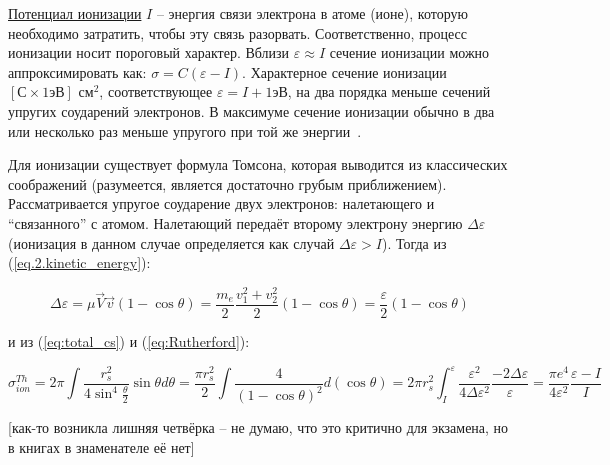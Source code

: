 \documentclass[10pt, a4paper]{article}
\numberwithin{equation}{section}
\begin{document}
\uline{Потенциал ионизации} $I$ -- энергия связи электрона в атоме (ионе), которую необходимо затратить, чтобы эту связь разорвать. Соответственно, процесс ионизации носит пороговый характер. Вблизи $\varepsilon \approx I$ сечение ионизации можно аппроксимировать как: $\sigma = C(\varepsilon-I)$. Характерное сечение
ионизации $[С\times1 \text{эВ}]$ см$^2$, соответствующее $\varepsilon = I + 1\text{эВ}$, на два порядка
меньше сечений упругих соударений электронов. В максимуме сечение ионизации обычно в два или несколько раз меньше упругого при той же энергии~\cite{raizer}.

Для ионизации существует формула Томсона, которая выводится из классических соображений (разумеется, является достаточно грубым приближением). Рассматривается упругое соударение двух электронов: налетающего и ``связанного'' с атомом. Налетающий передаёт второму электрону энергию $\Delta\varepsilon$ (ионизация в данном случае определяется как случай $\Delta\varepsilon > I$). Тогда из (\ref{eq.2.kinetic_energy}):

\begin{equation*}
	\Delta \varepsilon = \mu \vec{V}\vec{v} (1-\cos\theta) = \frac{m_e}{2} \frac{v_1^2+v_2^2}{2} (1-\cos\theta) = \frac{\varepsilon}{2} (1-\cos\theta)
\end{equation*}

и из (\ref{eq:total_cs}) и (\ref{eq:Rutherford}):

\begin{equation*}
	\sigma_{ion}^{Th} = 2\pi\int\frac{r_s^2}{4\sin^4\frac{\theta}{2}}\sin\theta d\theta = \frac{\pi r_s^2}{2} \int\frac{4}{(1-\cos\theta)^2}d(\cos\theta) = 2\pi r_s^2\int_{I}^{\varepsilon}\frac{\varepsilon^2}{4\Delta\varepsilon^2}\frac{-2\Delta\varepsilon}{\varepsilon} = \frac{\pi e^4}{4\varepsilon^2}\frac{\varepsilon-I}{I}
\end{equation*}

[как-то возникла лишняя четвёрка -- не думаю, что это критично для экзамена, но в книгах в знаменателе её нет]
\end{document}

